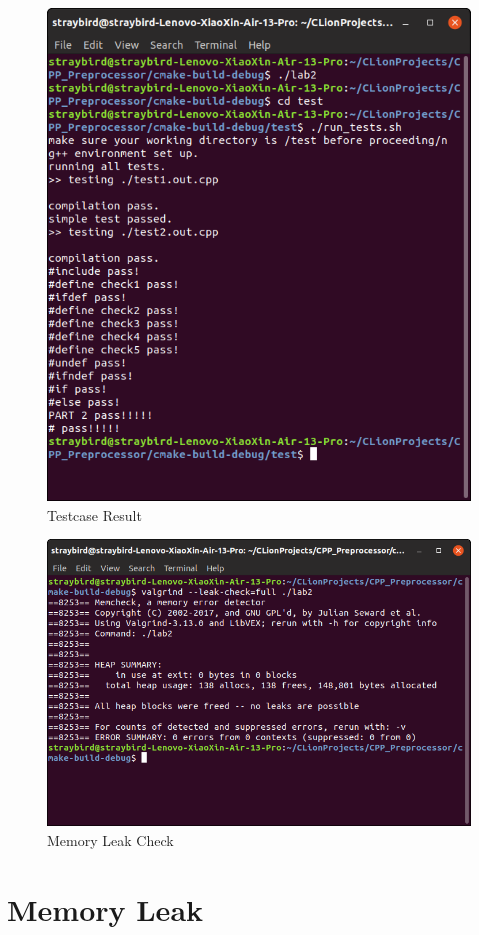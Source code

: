 \documentclass[a4paper]{report}
\begin{document}
\begin{figure}
  \centering
  \includegraphics[width=12cm]{shell.png}
  \caption{Testcase Result}\label{2}
\end{figure}

\begin{figure}
  \centering
  \includegraphics[width=12cm]{mem.png}
  \caption{Memory Leak Check}\label{2}
\end{figure}

\chapter{Memory Leak}
\end{document}
